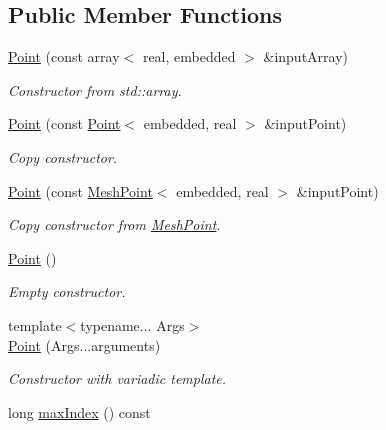 \subsection*{\-Public \-Member \-Functions}
\begin{DoxyCompactItemize}
\item 
\hypertarget{class_point_a1dff5286bb0a775c7db78320da11f3d4}{\hyperlink{class_point_a1dff5286bb0a775c7db78320da11f3d4}{\-Point} (const array$<$ real, embedded $>$ \&input\-Array)}\label{class_point_a1dff5286bb0a775c7db78320da11f3d4}

\begin{DoxyCompactList}\small\item\em \-Constructor from std\-::array. \end{DoxyCompactList}\item 
\hypertarget{class_point_a5c9c38f9f77cd9089a3a5cadedfee70c}{\hyperlink{class_point_a5c9c38f9f77cd9089a3a5cadedfee70c}{\-Point} (const \hyperlink{class_point}{\-Point}$<$ embedded, real $>$ \&input\-Point)}\label{class_point_a5c9c38f9f77cd9089a3a5cadedfee70c}

\begin{DoxyCompactList}\small\item\em \-Copy constructor. \end{DoxyCompactList}\item 
\hypertarget{class_point_ab4cb590995d17da1537e35f32da3e498}{\hyperlink{class_point_ab4cb590995d17da1537e35f32da3e498}{\-Point} (const \hyperlink{class_mesh_point}{\-Mesh\-Point}$<$ embedded, real $>$ \&input\-Point)}\label{class_point_ab4cb590995d17da1537e35f32da3e498}

\begin{DoxyCompactList}\small\item\em \-Copy constructor from \hyperlink{class_mesh_point}{\-Mesh\-Point}. \end{DoxyCompactList}\item 
\hypertarget{class_point_ab1a9e6eedb684c43816dc50c586df933}{\hyperlink{class_point_ab1a9e6eedb684c43816dc50c586df933}{\-Point} ()}\label{class_point_ab1a9e6eedb684c43816dc50c586df933}

\begin{DoxyCompactList}\small\item\em \-Empty constructor. \end{DoxyCompactList}\item 
{\footnotesize template$<$typename... \-Args$>$ }\\\hyperlink{class_point_ade059d5c3bf5513c9aaf6bc698f0bb24}{\-Point} (\-Args...\-arguments)
\begin{DoxyCompactList}\small\item\em \-Constructor with variadic template. \end{DoxyCompactList}\item 
\hypertarget{class_point_a4a87c9a65f2bcd966f1df83a870f117f}{long \hyperlink{class_point_a4a87c9a65f2bcd966f1df83a870f117f}{max\-Index} () const }\label{class_point_a4a87c9a65f2bcd966f1df83a870f117f}


\end{DoxyCompactItemize}
